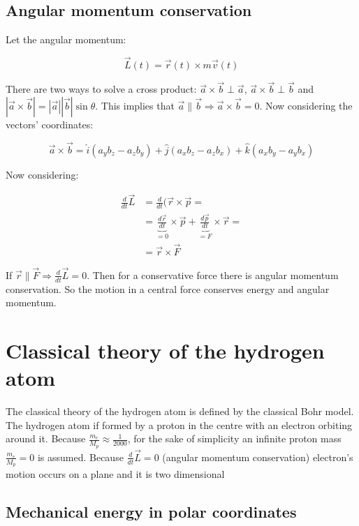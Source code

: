   \subsection{Angular momentum conservation}
  Let the angular momentum:

  $$\vec{L}(t) = \vec{r}(t)\times m \vec{v}(t)$$

  There are two ways to solve a cross product: $\vec{a}\times \vec{b}\perp \vec{a}$, $\vec{a}\times \vec{b}\perp \vec{b}$ and $|\vec{a}\times \vec{b}| = |\vec{a}||\vec{b}|\sin\theta$.
  This implies that $\vec{a}\parallel \vec{b}\Rightarrow \vec{a}\times \vec{b} = 0$.
  Now considering the vectors' coordinates:

  $$\vec{a}\times \vec{b} = \hat{i}(a_yb_z - a_zb_y) + \hat{j}(a_xb_z - a_zb_x) + \hat{k}(a_xb_y-a_yb_x)$$

  Now considering:

  \begin{align*}
    \frac{d{}}{d{t}}\vec{L} &= \frac{d{}}{d{t}}(\vec{r}\times \vec{p}=\\
                            &=\underbrace{\frac{d{\vec{r}}}{d{t}}}_{=0}\times\vec{p} + \underbrace{\frac{d{\vec{p}}}{d{t}}}_{=F}\times\vec{r} =\\
                            &= \vec{r}\times \vec{F}
  \end{align*}

  If $\vec{r}\parallel \vec{F}\Rightarrow \frac{d{}}{d{t}}\vec{L} = 0$.
  Then for a conservative force there is angular momentum conservation.
  So the motion in a central force conserves energy and angular momentum.

\section{Classical theory of the hydrogen atom}
The classical theory of the hydrogen atom is defined by the classical Bohr model.
The hydrogen atom if formed by a proton in the centre with an electron orbiting around it.
Because $\frac{m_e}{M_p}\approx \frac{1}{2000}$, for the sake of simplicity an infinite proton mass $\frac{m_e}{M_p}=0$ is assumed.
Because $\frac{d{}}{d{t}}\vec{L}=0$ (angular momentum conservation) electron's motion occurs on a plane and it is two dimensional

  \subsection{Mechanical energy in polar coordinates}

